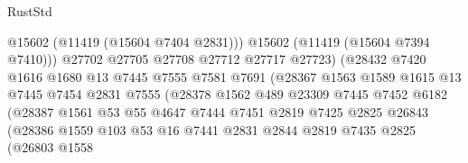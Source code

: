 \begin{lexlean}{RustStd}
\begin{coremodule}
                                      @15602
                                      (@11419 (@15604 @7404 @2831)))
                                    @15602
                                    (@11419 (@15604 @7394 @7410)))
                                  @27702
                                  @27705
                                  @27708
                                  @27712
                                  @27717
                                  @27723)
                                (@28432
                                  @7420
                                  @1616
                                  @1680
                                  @13
                                  @7445
                                  @7555
                                  @7581
                                  @7691
                                  (@28367
                                    @1563
                                    @1589
                                    @1615
                                    @13
                                    @7445
                                    @7454
                                    @2831
                                    @7555
                                    (@28378
                                      @1562
                                      @489
                                      @23309
                                      @7445
                                      @7452
                                      @6182
                                      (@28387
                                        @1561
                                        @53
                                        @55
                                        @4647
                                        @7444
                                        @7451
                                        @2819
                                        @7425
                                        @2825
                                        @26843
                                        (@28386
                                          @1559
                                          @103
                                          @53
                                          @16
                                          @7441
                                          @2831
                                          @2844
                                          @2819
                                          @7435
                                          @2825
                                          (@26803
                                            @1558

\end{coremodule}
\end{lexlean}
